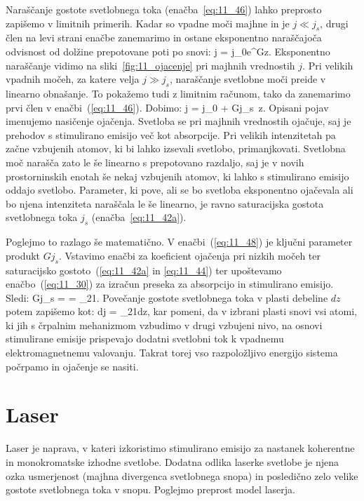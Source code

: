 Naraščanje gostote svetlobnega toka (enačba~\ref{eq:11_46}) 
lahko preprosto zapišemo v limitnih primerih. 
Kadar so vpadne moči majhne in je $j \ll j_s$, drugi člen
na levi strani enačbe zanemarimo in ostane eksponentno 
naraščajoča odvisnost od dolžine prepotovane poti po snovi:
\beq
j = j_0e^{Gz}.
\label{eq:11_47}
\eeq
Eksponentno naraščanje vidimo na sliki~\ref{fig:11_ojacenje}
pri majhnih vrednostih $j$. Pri velikih vpadnih močeh,
za katere velja $j \gg j_s$, naraščanje svetlobne moči preide
v linearno obnašanje. To pokažemo tudi z limitnim računom, tako
da zanemarimo prvi člen v enačbi~(\ref{eq:11_46}). Dobimo:
\beq
j = j_0 + Gj_s\, z.
\label{eq:11_48}
\eeq
Opisani pojav imenujemo nasičenje ojačenja. Svetloba se pri 
majhnih vrednostih ojačuje, saj je prehodov s stimulirano 
emisijo več kot absorpcije. Pri velikih intenzitetah pa začne
vzbujenih atomov, ki bi lahko izsevali svetlobo, primanjkovati.
Svetlobna moč narašča zato le še linearno s prepotovano razdaljo, 
saj je v novih prostorninskih enotah še nekaj vzbujenih atomov, 
ki lahko s stimulirano emisijo oddajo svetlobo. Parameter, ki pove, 
ali se bo svetloba eksponentno ojačevala ali bo njena
intenziteta naraščala le še linearno, je ravno saturacijska
gostota svetlobnega toka $j_s$ (enačba~\ref{eq:11_42a}). 

Poglejmo to razlago še matematično. V enačbi~(\ref{eq:11_48})
je ključni parameter produkt $Gj_s$. Vstavimo enačbi
za koeficient ojačenja pri nizkih močeh ter saturacijsko 
gostoto~(\ref{eq:11_42a} in \ref{eq:11_44}) ter
upoštevamo enačbo~(\ref{eq:11_30}) za izračun preseka
za absorpcijo in stimulirano emisijo. Sledi:
\beq
Gj_s = \cdot {} 
\cdot {}=
\hslash \omega_{21}.
\label{eq:11_49}
\eeq
Povečanje gostote svetlobnega toka v plasti debeline $dz$ potem zapišemo kot:
\beq
dj = \hslash \omega_{21}dz,
\label{eq:11_50}
\eeq
kar pomeni, da v izbrani plasti snovi vsi atomi, 
ki jih s črpalnim mehanizmom vzbudimo v drugi vzbujeni
nivo, na osnovi stimulirane emisije prispevajo dodatni 
svetlobni tok k vpadnemu elektromagnetnemu valovanju.
Takrat torej vso razpoložljivo energijo sistema počrpamo in ojačenje se nasiti. 

\section{Laser}
Laser je naprava, v kateri izkoristimo stimulirano emisijo 
za nastanek koherentne in monokromatske izhodne svetlobe. Dodatna odlika
laserke svetlobe je njena ozka usmerjenost (majhna divergenca svetlobnega snopa)
in posledično zelo velike gostote svetlobnega toka v snopu. Poglejmo preprost
model laserja.

